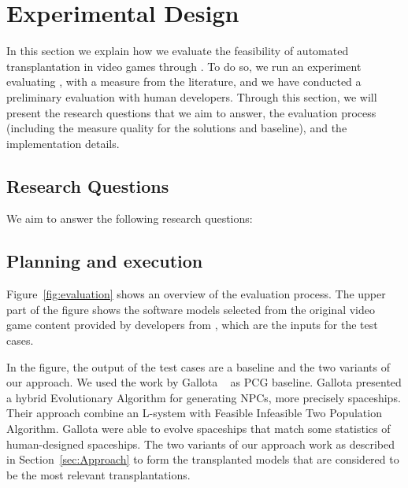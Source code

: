 \section{Experimental Design} \label{sec:Evaluation}

In this section we explain how we evaluate the feasibility of automated transplantation in video games through \ApproachName{}. To do so, we run an experiment evaluating \ApproachName, with a measure from the literature, and we have conducted a preliminary evaluation with human developers.
Through this section, we will present the research questions that we aim to answer, the evaluation
process (including the measure quality for the solutions and baseline), and the implementation details.

\subsection{Research Questions}
We aim to answer the following research questions:

\subsection{Planning and execution}

Figure~\ref{fig:evaluation} shows an overview of the evaluation process. The upper part of the figure shows the software models selected from the original video game content provided by developers from \CaseStudy{}, which are the inputs for the test cases. 

In the figure, the output of the test cases are a baseline and the two variants of our approach. We used the work by Gallota \etal~\cite{gallotta2022evolving} as PCG baseline. Gallota \etal presented a hybrid Evolutionary Algorithm for generating NPCs, more precisely spaceships. Their approach combine an L-system with Feasible Infeasible Two Population Algorithm. Gallota \etal were able to evolve spaceships that match some statistics of human-designed spaceships.
The two variants of our \ApproachName{} approach work as described in Section~\ref{sec:Approach} to form the transplanted models that are considered to be the most relevant transplantations.

